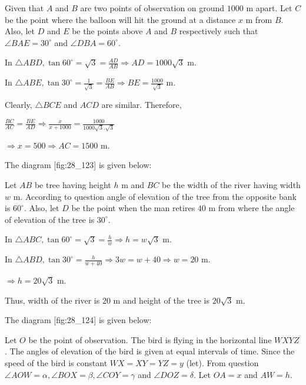   Given that $A$ and $B$ are two points of observation on ground $1000$ m apart. Let
  $C$ be the point where the balloon will hit the ground at a distance $x$ m from
  $B$. Also, let $D$ and $E$ be the points above $A$ and $B$ respectively
  such that $\angle BAE= 30^\circ$ and $\angle DBA = 60^\circ$.

  In $\triangle ABD, \tan60^\circ = \sqrt{3} = \frac{AD}{AB}\Rightarrow AD = 1000\sqrt{3}$ m.

  In $\triangle ABE, \tan30^\circ = \frac{1}{\sqrt{3}} = \frac{BE}{AB}\Rightarrow BE =
  \frac{1000}{\sqrt{3}}$ m.

  Clearly, $\triangle BCE$ and $ACD$ are similar. Therefore,

  $\frac{BC}{AC} = \frac{BE}{AD} \Rightarrow \frac{x}{x + 1000} =
  \frac{1000}{1000\sqrt{3}.\sqrt{3}}$

  $\Rightarrow x = 500 \Rightarrow AC = 1500$ m.

\item The diagram [fig:28_123] is given below:

  \startplacefigure[reference=fig:28_123]
    \externalfigure[28_123.pdf]
  \stopplacefigure

  Let $AB$ be tree having height $h$ m and $BC$ be the width of the river having width
  $w$ m. According to question angle of elevation of the tree from the opposite bank is
  $60^\circ$. Also, let $D$ be the point when the man retires $40$ m from where the
  angle of elevation of the tree is $30^\circ$.

  In $\triangle ABC, \tan60^\circ = \sqrt{3} = \frac{h}{w} \Rightarrow h = w\sqrt{3}$ m.

  In $\triangle ABD, \tan30^\circ = \frac{h}{w + 40}\Rightarrow 3w = w + 40 \Rightarrow w = 20$ m.

  $\Rightarrow h = 20\sqrt{3}$ m.

  Thus, width of the river is $20$ m and height of the tree is $20\sqrt{3}$ m.

\item The diagram [fig:28_124] is given below:

  \startplacefigure[reference=fig:28_124]
    \externalfigure[28_124.pdf]
  \stopplacefigure

  Let $O$ be the point of observation. The bird is flying in the horizontal line $WXYZ$. The
  angles of elevation of the bird is given at equal intervals of time. Since the speed of the bird is
  constant $WX = XY = YZ = y$ (let). From question $\angle AOW = \alpha, \angle BOX = \beta,
  \angle COY = \gamma$ and $\angle DOZ = \delta$. Let $OA = x$ and $AW = h$.

